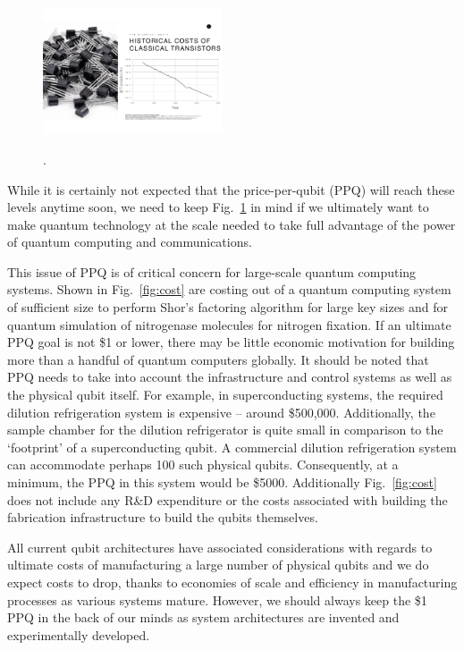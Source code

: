 \documentclass[twocolumn, aps, rmp, amsmath, amssymb, nofootinbib, superscriptaddress, longbibliography, floatfix, table-of-contents, eqsecnum]{revtex4-2}
\begin{document}
\begin{figure}[htbp!]
	\includegraphics[clip=true, width=0.475\textwidth]{cost}
	\caption{} \label{fig:price}.
\end{figure}

While it is certainly not expected that the price-per-qubit (PPQ) will reach these levels anytime soon, we need to keep Fig.~\ref{fig:price} in mind if we ultimately want to make quantum technology at the scale needed to take full advantage of the power of quantum computing and communications. 

This issue of PPQ is of critical concern for large-scale quantum computing systems. Shown in Fig.~\ref{fig:cost} are costing out of a quantum computing system of sufficient size to perform Shor's factoring algorithm for large key sizes and for quantum simulation of nitrogenase molecules for nitrogen fixation. If an ultimate PPQ goal is not \$1 or lower, there may be little economic motivation for building more than a handful of quantum computers globally. It should be noted that PPQ needs to take into account the infrastructure and control systems as well as the physical qubit itself. For example, in superconducting systems, the required dilution refrigeration system is expensive -- around \$500,000. Additionally, the sample chamber for the dilution refrigerator is quite small in comparison to the `footprint' of a superconducting qubit. A commercial dilution refrigeration system can accommodate perhaps 100 such physical qubits. Consequently, at a minimum, the PPQ in this system would be \$5000.  Additionally Fig.~\ref{fig:cost} does not include any R\&D expenditure or the costs associated with building the fabrication infrastructure to build the qubits themselves. 

All current qubit architectures have associated considerations with regards to ultimate costs of manufacturing a large number of physical qubits and we do expect costs to drop, thanks to economies of scale and efficiency in manufacturing processes as various systems mature. However, we should always keep the \$1 PPQ in the back of our minds as system architectures are invented and experimentally developed. 
\end{document}
